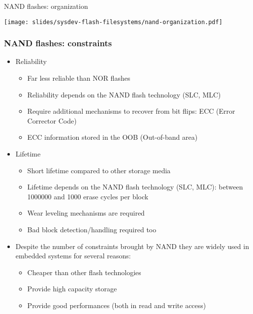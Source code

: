 \begin{frame}{NAND flashes: organization}
  \begin{center}
    \texttt{[image: slides/sysdev-flash-filesystems/nand-organization.pdf]}
  \end{center}
\end{frame}

\begin{frame}
  \frametitle{NAND flashes: constraints}
  \begin{itemize}
  \item Reliability
    \begin{itemize}
    \item Far less reliable than NOR flashes
    \item Reliability depends on the NAND flash technology (SLC, MLC)
    \item Require additional mechanisms to recover from bit flips: ECC
      (Error Corrector Code)
    \item ECC information stored in the OOB (Out-of-band area)
    \end{itemize}
  \item Lifetime
    \begin{itemize}
    \item Short lifetime compared to other storage media
    \item Lifetime depends on the NAND flash technology (SLC, MLC):
      between 1000000 and 1000 erase cycles per block
    \item Wear leveling mechanisms are required
    \item Bad block detection/handling required too
    \end{itemize}
  \item Despite the number of constraints brought by NAND they are
    widely used in embedded systems for several reasons:
    \begin{itemize}
    \item Cheaper than other flash technologies
    \item Provide high capacity storage
    \item Provide good performances (both in read and write access)
    \end{itemize}
  \end{itemize}
\end{frame}

